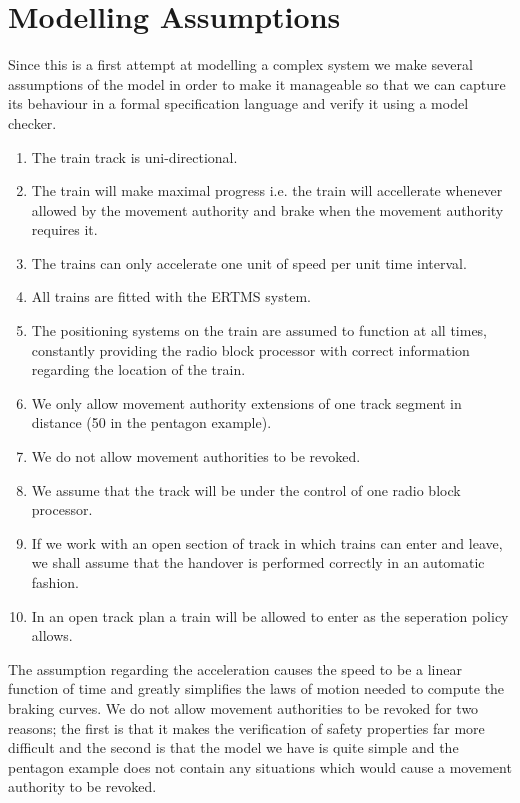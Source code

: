\section{Modelling Assumptions}
Since this is a first attempt at modelling a complex system we make several assumptions of the model in order to make it manageable so that we can capture its behaviour in a formal specification language and verify it using a model checker.
%
\begin{enumerate}

\item The train track is uni-directional.

\item The train will make maximal progress i.e. the train will accellerate whenever allowed by the movement authority and brake when the movement authority requires it.

\item The trains can only accelerate one unit of speed per unit time interval.

\item All trains are fitted with the ERTMS system.

\item The positioning systems on the train are assumed to function at all times, constantly providing the radio block processor with correct information regarding the location of the train.

\item We only allow movement authority extensions of one track segment in distance (50 in the pentagon example).

\item We do not allow movement authorities to be revoked.

\item We assume that the track will be under the control of one radio block processor.

\item If we work with an open section of track in which trains can enter and leave, we shall assume that the handover is performed correctly in an automatic fashion.

\item In an open track plan a train will be allowed to enter as the seperation policy allows.
\end{enumerate}
%
The assumption regarding the acceleration causes the speed to be a linear function of time and greatly simplifies the laws of motion needed to compute the braking curves.   We do not allow movement authorities to be revoked for two reasons; the first is that it makes the verification of safety properties far more difficult and the second is that the model we have is quite simple and the pentagon example does not contain any situations which would cause a movement authority to be revoked.
%
